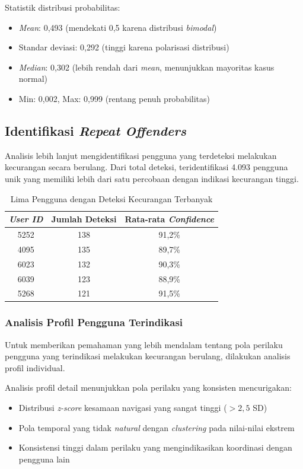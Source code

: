 Statistik distribusi probabilitas:
\begin{itemize}
    \item \textit{Mean}: 0,493 (mendekati 0,5 karena distribusi \textit{bimodal})
    \item Standar deviasi: 0,292 (tinggi karena polarisasi distribusi)
    \item \textit{Median}: 0,302 (lebih rendah dari \textit{mean}, menunjukkan mayoritas kasus normal)
    \item Min: 0,002, Max: 0,999 (rentang penuh probabilitas)
\end{itemize}

\subsection{Identifikasi \textit{Repeat Offenders}}
\label{subsec:identifikasiRepeatOffenders}

Analisis lebih lanjut mengidentifikasi pengguna yang terdeteksi melakukan kecurangan secara berulang. Dari total deteksi, teridentifikasi 4.093 pengguna unik yang memiliki lebih dari satu percobaan dengan indikasi kecurangan tinggi.

\begin{table}[htbp]
\centering
\caption{Lima Pengguna dengan Deteksi Kecurangan Terbanyak}
\label{tabel:topOffenders}
\begin{tabular}{|c|c|c|}
\hline
\textbf{\textit{User ID}} & \textbf{Jumlah Deteksi} & \textbf{Rata-rata \textit{Confidence}} \\
\hline
5252 & 138 & 91,2\% \\
\hline
4095 & 135 & 89,7\% \\
\hline
6023 & 132 & 90,3\% \\
\hline
6039 & 123 & 88,9\% \\
\hline
5268 & 121 & 91,5\% \\
\hline
\end{tabular}
\end{table}

\subsubsection{Analisis Profil Pengguna Terindikasi}

Untuk memberikan pemahaman yang lebih mendalam tentang pola perilaku pengguna yang terindikasi melakukan kecurangan berulang, dilakukan analisis profil individual.

Analisis profil detail menunjukkan pola perilaku yang konsisten mencurigakan:
\begin{itemize}
    \item Distribusi \textit{z-score} kesamaan navigasi yang sangat tinggi ($>2,5$ SD)
    \item Pola temporal yang tidak \textit{natural} dengan \textit{clustering} pada nilai-nilai ekstrem
    \item Konsistensi tinggi dalam perilaku yang mengindikasikan koordinasi dengan pengguna lain
\end{itemize}

